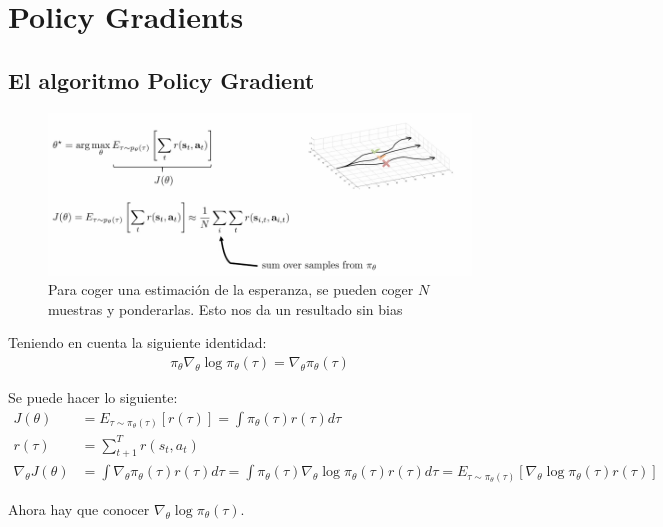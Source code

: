 \chapter{Policy Gradients}


\section{El algoritmo Policy Gradient}%
\label{sec:el_algoritmo_policy_gradient}

\begin{figure}[htpb]
	\centering
	\includegraphics[width=1.0\linewidth]{figures/2020-06-13-111845_916x352_scrot.png}
	\caption{Para coger una estimación de la esperanza, se pueden coger $N$ muestras y
    ponderarlas. Esto nos da un resultado sin bias}
\end{figure}

Teniendo en cuenta la siguiente identidad:
\begin{align}
    \pi_\theta\nabla_\theta\log\pi_\theta(\tau) =
    \nabla_\theta\pi_\theta(\tau)
\end{align}

Se puede hacer lo siguiente:
\begin{align}
        J ( \theta ) &= E _ { \tau \sim \pi _ { \theta } ( \tau ) } [ r ( \tau ) ] = \int \pi _ { \theta }
        ( \tau ) r ( \tau ) d \tau \\
        r(\tau) &= \sum_{t+1}^T r(s_t,a_t)\\
        \nabla _ { \theta } J ( \theta ) &= \int \nabla _ { \theta } \pi _ { \theta } ( \tau ) r ( \tau ) d \tau = \int \pi _ { \theta } ( \tau ) \nabla _ { \theta } \operatorname { log } \pi _ { \theta } ( \tau ) r ( \tau ) d \tau = E _ { \tau \sim \pi _ { \theta } ( \tau ) } [ \nabla _ { \theta } \operatorname { log } \pi _ { \theta } ( \tau ) r ( \tau ) ]
\end{align}

Ahora hay que conocer $\nabla_\theta\log\pi_\theta(\tau)$.

